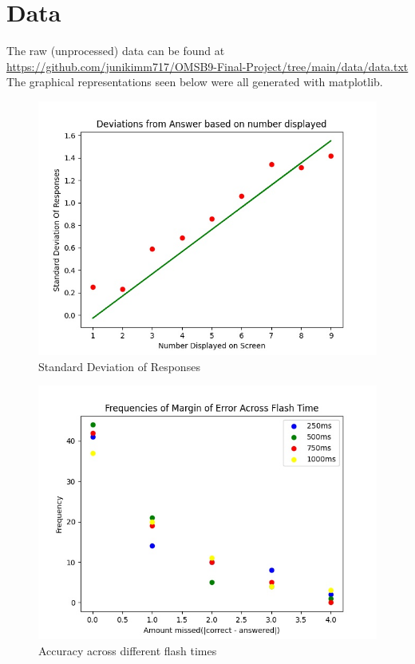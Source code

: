 \documentclass[12pt]{article}
\begin{document}
\section{Data}
The raw (unprocessed) data can be found at \\
\url{https://github.com/junikimm717/OMSB9-Final-Project/tree/main/data/data.txt}
The graphical representations seen below were all generated with matplotlib.

\begin{figure} [p]
\centering
\includegraphics[scale=0.4]{regression.jpg}
\caption{Standard Deviation of Responses}
\end{figure}

\begin{figure} [p]
\centering
\includegraphics[scale=0.4]{reaction.jpg}
\caption{Accuracy across different flash times}
\end{figure}
\end{document}
